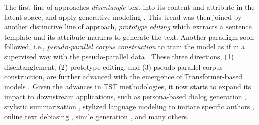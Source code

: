 The first line of approaches \textit{disentangle} text into its content and attribute in the latent space, and apply generative modeling .
This trend was then joined by another distinctive line of approach, \textit{prototype editing}  which extracts a sentence template and its attribute markers to generate the text. Another paradigm soon followed, i.e., \textit{pseudo-parallel corpus construction} to train the model as if in a supervised way with the pseudo-parallel data . These three directions, (1) disentanglement, (2) prototype editing, and (3) pseudo-parallel corpus construction, are further advanced with the emergence of Transformer-based models .
Given the advances in TST methodologies, it now starts to expand its impact to downstream applications, such as persona-based dialog generation , stylistic summarization , stylized language modeling to imitate specific authors , online text debiasing , simile generation , and many others.
